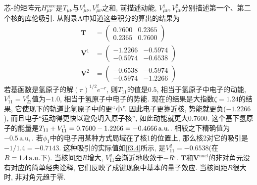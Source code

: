 芯-\ha 的矩阵元$H_{\mu\nu}^\mathrm{core}$是$T_{\mu\nu}$与$V_{\mu\nu}^1,V_{\mu\nu}^2$之和, 前描述动能, $V_{\mu\nu}^1,V_{\mu\nu}^2$分别描述第一个、第二个核的库伦吸引. 从附录A中知道这些积分的算出的结果为
\begin{align}
\mathbf{T} & = 
\begin{pmatrix}
0.7600&0.2365\\0.2365&0.7600
\end{pmatrix}\\
\mathbf{V}^1 & = 
\begin{pmatrix}
-1.2266&-0.5974\\-0.5974&-0.6538
\end{pmatrix}\\
\mathbf{V}^2 & = 
\begin{pmatrix}
-0.6538&-0.5974\\-0.5974&-1.2266
\end{pmatrix}
\end{align}
若基函数是氢原子的解$(\pi)^{1/2}e^{-r}$, 则$T_{11}$的值是$0.5$, 相当于氢原子中电子的动能, $V_{11}^1=V_{22}^2$值为$-1.0$, 相当于氢原子中电子的势能. 现在的结果是大指数$\zeta=1.24$的结果, 它使现下的轨道比氢原子中的更``小”. 因此电子更靠近核, 势能就更负($-1.2266$), 而且电子``运动得更快以避免坍入原子核”, 如此动能就更大$0.7600$. 这个基下氢原子的能量是$T_{11}+V_{11}^1=0.7600-1.2266=-0.4666\,\mathrm{a.u.}$. 相较之下精确值为$-0.5\,\mathrm{a.u,}$. 若$\phi_1$中的电子用某种方式局域在了核1的位置上, 那么核2对它的吸引是$-1/1.4=-0.7143$. 这种吸引的实际值如\ref{f3.4}所示, 是$V_{11}^2=-0.6538$(在$R=1.4\,\mathrm{a.u.}$下). 当核间距$R$增大, $V_{11}^2$会渐近地收敛于$-R^{_1}$. $\mathbf{T}$和$\mathbf{V}^\mathrm{nucl}$的非对角元没有对应的简单经典诠释, 它们反映了成键现象中基本的量子效应. 当核间距$R$很大时, 非对角元趋于零.

